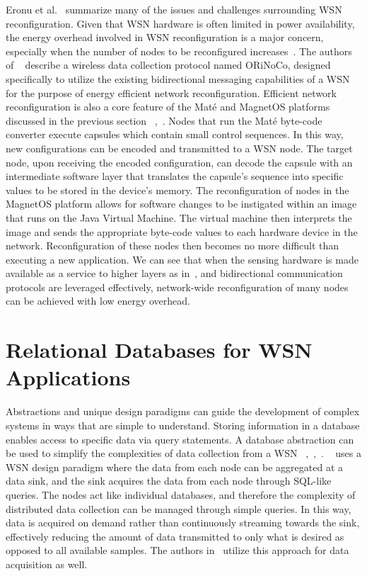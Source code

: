 Eronu et al.~\cite{Eronu} summarize many of the issues and challenges surrounding WSN reconfiguration. Given that WSN hardware is often limited in power availability, the energy overhead involved in WSN reconfiguration is a major concern, especially when the number of nodes to be reconfigured increases~\cite{Eronu}. The authors of ~\cite{Reinhardt} describe a wireless data collection protocol named ORiNoCo, designed specifically to utilize the existing bidirectional messaging capabilities of a WSN for the purpose of energy efficient network reconfiguration. Efficient network reconfiguration is also a core feature of the Mat\'e and MagnetOS platforms discussed in the previous section ~\cite{Levis},~\cite{Barr}. Nodes that run the Mat\'e byte-code converter execute capsules which contain small control sequences. In this way, new configurations can be encoded and transmitted to a WSN node. The target node, upon receiving the encoded configuration, can decode the capsule with an intermediate software layer that translates the capsule's sequence into specific values to be stored in the device's memory. The reconfiguration of nodes in the MagnetOS platform allows for software changes to be instigated within an image that runs on the Java Virtual Machine. The virtual machine then interprets the image and sends the appropriate byte-code values to each hardware device in the network. Reconfiguration of these nodes then becomes no more difficult than executing a new application. We can see that when the sensing hardware is made available as a service to higher layers as in~\cite{Ivester}, and bidirectional communication protocols are leveraged effectively, network-wide reconfiguration of many nodes can be achieved with low energy overhead. 

\section{Relational Databases for WSN Applications}
Abstractions and unique design paradigms can guide the development of complex systems in ways that are simple to understand. Storing information in a database enables access to specific data via query statements. A database abstraction can be used to simplify the complexities of data collection from a WSN ~\cite{Madden},~\cite{Diallo},~\cite{Chagas}. ~\cite{Madden} uses a WSN design paradigm where the data from each node can be aggregated at a data sink, and the sink acquires the data from each node through SQL-like queries. The nodes act like individual databases, and therefore the complexity of distributed data collection can be managed through simple queries. In this way, data is acquired on demand rather than continuously streaming towards the sink, effectively reducing the amount of data transmitted to only what is desired as opposed to all available samples. The authors in~\cite{Chagas} utilize this approach for data acquisition as well.

